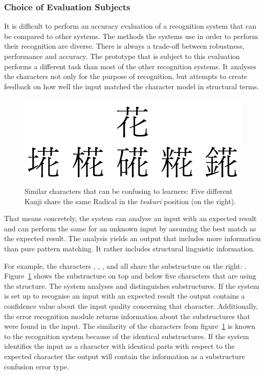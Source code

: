 \subsubsection{Choice of Evaluation Subjects}
\label{sec:eval:evaluationsubjects}
It is difficult to perform an accuracy evaluation of a recognition system
that can be compared to other systems. The methods the systems use in order
to perform their recognition are diverse. There is always a trade-off between
robustness, performance and accuracy.
The prototype that is subject to this evaluation performs a different
task than most of the other recognition systems. It analyses the characters
not only for the purpose of recognition, but attempts to create feedback on
how well the input matched the character model in structural terms.
\begin{figure}[htbp]
  \begin{center}
    \includegraphics[scale=0.4]{images/simlarCharaters.png}
    \caption{Similar characters that can be confusing to learners: Five different Kanji share the same Radical in the \emph{tsukuri} position (on the right).}
    \label{fig:similarcharactersforuserconfusion}
  \end{center}
\end{figure}
That means concretely, the system can analyse an input with an expected result
and can perform the same for an unknown input by assuming the best match
as the expected result. The analysis yields an output that includes more
information than pure pattern matching. It rather includes structural linguistic 
information.

For example, the characters 
, , ,  and  all share the substructure
on the right: .
Figure~\ref{fig:similarcharactersforuserconfusion} shows the
substructure on top and below five characters that are using the structure.
The system analyses and distinguishes substructures. If the system is set
up to recognise an input with an expected result the output contains
a confidence value about the input quality concerning that character.
Additionally, the error recognition module returns information about the
substructures that were found in the input.
The similarity of the characters from 
figure~\ref{fig:similarcharactersforuserconfusion} is known to
the recognition system because of the identical substructures.
If the system identifies the input as a character with identical parts
with respect to the expected character the output will contain the information
as a substructure confusion error type.

